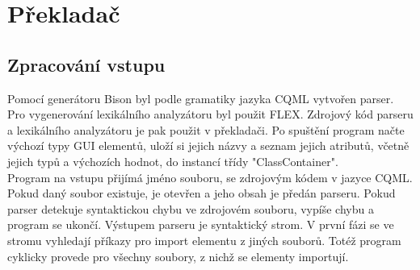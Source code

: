 \documentclass[report,11pt]{elsarticle}
\begin{document}
\section{\label{SEC:aa}Překladač}
\subsection{Zpracování vstupu}
Pomocí generátoru Bison byl podle gramatiky jazyka CQML vytvořen parser. Pro vygenerování lexikálního analyzátoru byl použit FLEX. Zdrojový kód parseru a lexikálního analyzátoru je pak použit v překladači.
Po spuštění program načte výchozí typy GUI elementů, uloží si jejich názvy a seznam jejich atributů, včetně jejich typů a výchozích hodnot, do instancí třídy "ClassContainer".\\
Program na vstupu přijímá jméno souboru, se zdrojovým kódem v jazyce CQML. Pokud daný soubor existuje, je otevřen a jeho obsah je předán parseru. Pokud parser detekuje syntaktickou chybu ve zdrojovém souboru, vypíše chybu a program se ukončí. Výstupem parseru je syntaktický strom. V první fázi se ve stromu vyhledají příkazy pro import elementu z jiných souborů. Totéž program cyklicky provede pro všechny soubory, z nichž se elementy importují.
\end{document}
